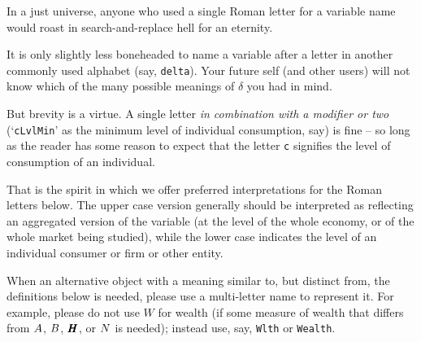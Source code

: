
In a just universe, anyone who used a single Roman letter for a variable name would roast in search-and-replace hell for an eternity.

It is only slightly less boneheaded to name a variable after a letter in another commonly used alphabet (say, \texttt{delta}).  Your future self (and other users) will not know which of the many possible meanings of $\delta$ you had in mind.

But brevity is a virtue.  A single letter {\it in combination with a modifier or two} (`\texttt{cLvlMin}' as the minimum level of individual consumption, say) is fine -- so long as the reader has some reason to expect that the letter \texttt{c} signifies the level of consumption of an individual.

That is the spirit in which we offer preferred interpretations for the Roman letters below.  The upper case
version generally should be interpreted as reflecting an aggregated version of the variable (at the level of the whole economy, or of the whole market being studied), while the lower case indicates the level of an individual consumer or firm or other entity.

When an alternative object with a meaning similar to, but distinct from, the definitions below is needed, please use a multi-letter name to represent it.  For example, please do not use $W$ for wealth (if some measure of wealth that differs from $A$, $B$, $\pmb{H}$, or $N$ is needed); instead use, say, \texttt{Wlth} or \texttt{Wealth}.

\pagebreak

